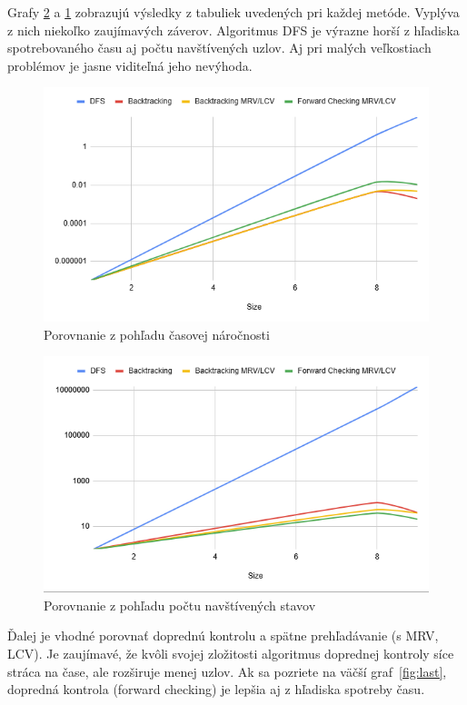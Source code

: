 Grafy \ref{fig:size} a \ref{fig:time} zobrazujú výsledky z tabuliek uvedených pri každej metóde. Vyplýva z nich niekoľko zaujímavých záverov. Algoritmus DFS je výrazne horší z hľadiska spotrebovaného času aj počtu navštívených uzlov. Aj pri malých veľkostiach problémov je jasne viditeľná jeho nevýhoda.\par
\begin{figure}
    \centering
    \includegraphics[width=1\textwidth]{figs/img_1}
    \caption{Porovnanie z pohľadu časovej náročnosti}
    \label{fig:time}
\end{figure}
\begin{figure}
    \centering
    \includegraphics[width=1\textwidth]{figs/img}
    \caption{Porovnanie z pohľadu počtu navštívených stavov}
    \label{fig:size}
\end{figure}
Ďalej je vhodné porovnať doprednú kontrolu a spätne prehľadávanie (s MRV, LCV). Je zaujímavé, že kvôli svojej zložitosti algoritmus doprednej kontroly síce stráca na čase, ale rozširuje menej uzlov. Ak sa pozriete na väčší graf~\ref{fig:last}, dopredná kontrola (forward checking) je lepšia aj z hľadiska spotreby času.
